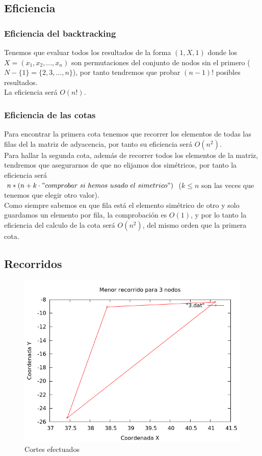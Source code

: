\subsection{Eficiencia}
\subsubsection{Eficiencia del backtracking}

Tenemos que evaluar todos los resultados de la forma $(1, X, 1)$ donde los $X = (x_1, x_2, ... , x_n)$ son permutaciones del conjunto de nodos sin el primero ($N - \{1\} = \{2, 3, ... , n\}$), por tanto tendremos que probar $(n-1)!$ posibles resultados.\\
La eficiencia será $O(n!)$.

\subsubsection{Eficiencia de las cotas}

Para encontrar la primera cota tenemos que recorrer los elementos de todas las filas del la matriz de adyacencia, por tanto su eficiencia será $O(n^2)$.\\

Para hallar la segunda cota, además de recorrer todos los elementos de la matriz, tendremos 
que asegurarnos de que no elijamos dos simétricos, por tanto la eficiencia será\\ 
$n*(n + k \cdot "comprobar\ si\ hemos\ usado\ el\ simetrico")$ ($k \leq n$ son las veces que 
tenemos que elegir otro valor).\\
Como siempre sabemos en que fila está el elemento simétrico de otro y solo guardamos un elemento 
por fila, la comprobación es $O(1)$, y por lo tanto la eficiencia del calculo de la cota será 
$O(n^2)$, del mismo orden que la primera cota.


\newpage
\subsection{Recorridos}

\begin{figure}[H]
    \centering
    \includegraphics[scale=0.5]{../TSP/Graficas/3.png}
    \caption{Cortes efectuados}
\end{figure}

